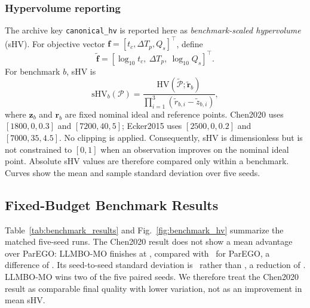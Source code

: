 \subsubsection{Hypervolume reporting}
The archive key \texttt{canonical\_hv} is reported here as
\emph{benchmark-scaled hypervolume} (sHV). For objective vector
$\mathbf f=[t_c,\Delta T_p,Q_s]^\top$, define
\begin{equation}
\tilde{\mathbf f}
=
[\log_{10}t_c,\ \Delta T_p,\ \log_{10}Q_s]^\top .
\end{equation}
For benchmark $b$, sHV is
\begin{equation}
\mathrm{sHV}_b(\mathcal P)
=
\frac{\mathrm{HV}(\tilde{\mathcal P};\tilde{\mathbf r}_b)}
{\prod_{i=1}^{3}(\tilde r_{b,i}-\tilde z_{b,i})},
\label{eq:scaled_hv}
\end{equation}
where $\mathbf z_b$ and $\mathbf r_b$ are fixed nominal ideal and reference
points. Chen2020 uses $[1800,0,0.3]$ and $[7200,40,5]$; Ecker2015 uses
$[2500,0,0.2]$ and $[7000,35,4.5]$. No clipping is applied. Consequently,
sHV is dimensionless but is not constrained to $[0,1]$ when an observation
improves on the nominal ideal point. Absolute sHV values are therefore
compared only within a benchmark. Curves show the mean and sample standard
deviation over five seeds.

\subsection{Fixed-Budget Benchmark Results}

Table~\ref{tab:benchmark_results} and Fig.~\ref{fig:benchmark_hv} summarize
the matched five-seed runs. The Chen2020 result does not show a mean advantage
over ParEGO: LLMBO-MO finishes at \ChenLLMBOMean, compared with
\ChenParEGOMean\ for ParEGO, a difference of \ChenLLMBORelative. Its
seed-to-seed standard deviation is \ChenLLMBOStd\ rather than
\ChenParEGOStd, a reduction of \ChenLLMBOStdReduction. LLMBO-MO wins two of
the five paired seeds. We therefore treat the Chen2020 result as comparable
final quality with lower variation, not as an improvement in mean sHV.

